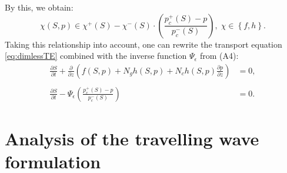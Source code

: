 \documentclass[smallextended]{svjour3}       %
\begin{document}
By this, we obtain:
\begin{equation*}
\chi \left( S, p \right) \in \chi^+\left( S \right) - \chi^-\left( S \right) \cdot \left( \frac{p_c^+\left( S \right) -p}{p_c^-\left( S \right)} \right),\; \chi \in \left\{ f,h \right\}.
\end{equation*}
Taking this relationship into account, one can rewrite the transport equation \eqref{eq:dimlessTE} combined with the inverse function $\Psi_\epsilon$ from (A4):
\begin{align}
\label{eq:TE}
\frac{\partial S}{\partial t} +  \frac{\partial}{\partial z}\left( f\left(S,p \right) + N_g h\left(S,p \right) + N_c h\left(S,p \right) \frac{\partial p}{\partial z} \right) &= 0, \\
\nonumber
\\
\label{eq:hyst_psi}
\frac{\partial S}{\partial t} -  \Psi_\epsilon \left( \frac{p_c^+\left( S \right) -p}{p_c^-\left( S \right)} \right) &= 0.
\end{align}

\section{Analysis of the travelling wave formulation}
\end{document}
